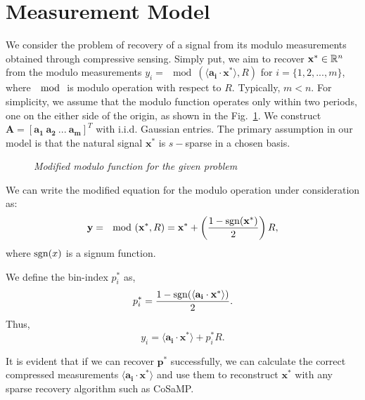 \section{Measurement Model}
We consider the problem of recovery of a signal from its modulo measurements obtained through compressive sensing. Simply put, we aim to recover $\mathbf{x^*}\in {\mathbb{R}}^n$ from the modulo measurements $y_i=\mod(\langle \mathbf{a_i} \cdot \mathbf{x^*} \rangle,R)$ for $i = \{1,2,...,m\}$, where $\mod$ is modulo operation with respect to $R$. Typically, $m<n$. For simplicity, we assume that the modulo function operates only within two periods, one on the either side of the origin, as shown in the Fig.~\ref{fig:graph}. We construct $\mathbf{A} = \left[\mathbf{a_1~a_2~...~a_m}\right]^T$ with i.i.d. Gaussian entries. The primary assumption in our model is that the natural signal $\mathbf{x^*}$ is $s-$sparse in a chosen basis. 

\begin{figure}[h]
	\begin{center}
\end{center}
\caption{\emph{Modified modulo function for the given problem}}
\label{fig:graph}
\end{figure}

We can write the modified equation for the modulo operation under consideration as:
$$
\mathbf{y} = \mod(\mathbf{x^*},R) = \mathbf{x^*}+\left( \frac{1-\mathrm{sgn}(\mathbf{x^*})}{2}\right)R,
$$
where $\mathrm{sgn}(x)$ is a signum function.

We define the bin-index $p^*_i$ as,
$$
p^*_i = \frac{1-\mathrm{sgn}(\langle \mathbf{a_i} \cdot \mathbf{x^*} \rangle)}{2}.
$$
Thus,
$$
y_i = \langle \mathbf{a_i} \cdot \mathbf{x^*} \rangle + p^*_iR.
$$

It is evident that if we can recover $\mathbf{p^*}$ successfully, we can calculate the correct compressed measurements $\langle \mathbf{a_i} \cdot \mathbf{x^*} \rangle$ and use them to reconstruct $\mathbf{x^*}$ with any sparse recovery algorithm such as CoSaMP.


